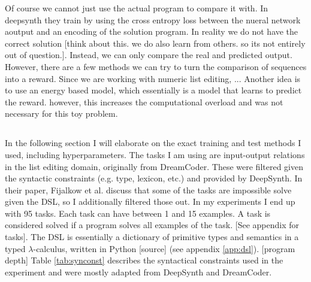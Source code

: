 Of course we cannot just use the actual program to compare it with. In deepsynth they train by using the cross entropy loss between the nueral network aoutput and an encoding of the solution program. In reality we do not have the correct solution [think about this. we do also learn from others. so its not entirely out of question.]. Instead, we can only compare the real and predicted output. However, there are a few methods we can try to turn the comparison of sequences into a reward. Since we are working with numeric list editing, ...
Another idea is to use an energy based model, which essentially is a model that learns to predict the reward. however, this increases the computational overload and was not necessary for this toy problem.








\subsection{}
In the following section I will elaborate on the exact training and test methods I used, including hyperparameters.
The tasks I am using are input-output relations in the list editing domain, originally from DreamCoder. These were filtered given the syntactic constraints (e.g. type, lexicon, etc.) and provided by DeepSynth. 
In their paper, Fijalkow et al. discuss that some of the tasks are impossible solve given the DSL, so I additionally filtered those out. In my experiments I end up with 95 tasks. Each task can have between 1 and 15 examples. A task is considered solved if a program solves all examples of the task. [See appendix for tasks].
The DSL is essentially a dictionary of primitive types and semantics in a typed $\lambda$-calculus, written in Python [source] (see appendix \ref{app:dsl}).
[program depth]
Table \ref{tab:synconst} describes the syntactical constraints used in the experiment and were mostly adapted from DeepSynth and DreamCoder.

